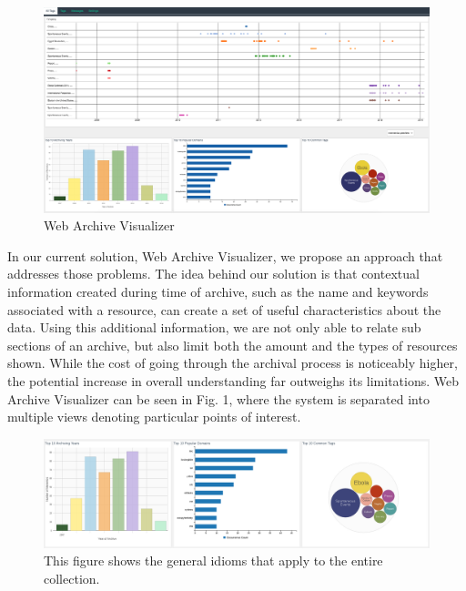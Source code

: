 \documentclass[10pt,journal,compsoc]{IEEEtran}
\begin{document}
\begin{figure}[t]
\centering
\includegraphics[scale=0.1]{Figure1}
\caption{Web Archive Visualizer}
\label{fig:mesh1}
\end{figure} 

In our current solution, Web Archive Visualizer, we propose an approach that addresses those problems. The idea behind our solution is that contextual information created during time of archive, such as the name and keywords associated with a resource, can create a set of useful characteristics about the data. Using this additional information, we are not only able to relate sub sections of an archive, but also limit both the amount and the types of resources shown. While the cost of going through the archival process is noticeably higher, the potential increase in overall understanding far outweighs its limitations. Web Archive Visualizer can be seen in Fig. 1, where the system is separated into multiple views denoting particular points of interest. \par

\begin{figure}
\centering
\includegraphics[width=\textwidth]{Figure3a}
\caption{This figure shows the general idioms that apply to the entire collection.}
\label{fig:mesh2}
\end{figure}
\end{document}
